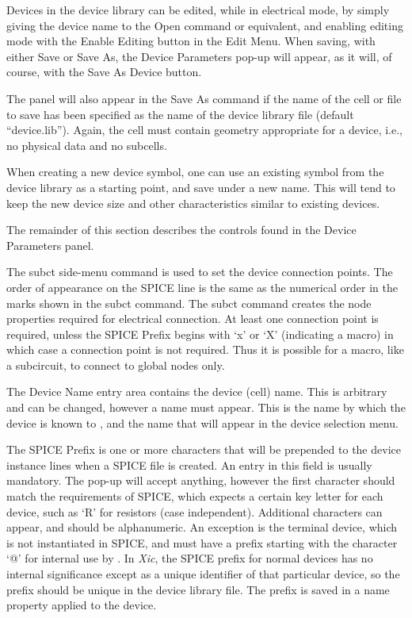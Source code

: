Devices in the device library can be edited, while in electrical mode,
by simply giving the device name to the {\cb Open} command or
equivalent, and enabling editing mode with the {\cb Enable Editing}
button in the {\cb Edit Menu}.  When saving, with either {\cb Save} or
{\cb Save As}, the {\cb Device Parameters} pop-up will appear, as it will,
of course, with the {\cb Save As Device} button.

The panel will also appear in the {\cb Save As} command if the name of
the cell or file to save has been specified as the name of the device
library file (default ``{\vt device.lib}'').  Again, the cell must
contain geometry appropriate for a device, i.e., no physical data and
no subcells. 

When creating a new device symbol, one can use an existing symbol from
the device library as a starting point, and save under a new name. 
This will tend to keep the new device size and other characteristics
similar to existing devices.

The remainder of this section describes the controls found in the 
{\cb Device Parameters} panel.

The {\cb subct} side-menu command is used to set the device connection
points.  The order of appearance on the SPICE line is the same as the
numerical order in the marks shown in the {\cb subct} command.  The
{\cb subct} command creates the {\et node} properties required for
electrical connection.  At least one connection point is required,
unless the {\cb SPICE Prefix} begins with `x' or `X' (indicating a
macro) in which case a connection point is not required.  Thus it is
possible for a macro, like a subcircuit, to connect to global nodes
only.

The {\cb Device Name} entry area contains the device (cell) name. 
This is arbitrary and can be changed, however a name must appear. 
This is the name by which the device is known to {\Xic}, and the name
that will appear in the device selection menu.

The {\cb SPICE Prefix} is one or more characters that will be
prepended to the device instance lines when a SPICE file is created. 
An entry in this field is usually mandatory.  The pop-up will accept
anything, however the first character should match the requirements of
SPICE, which expects a certain key letter for each device, such as
`{\vt R}' for resistors (case independent).  Additional characters can
appear, and should be alphanumeric.  An exception is the terminal
device, which is not instantiated in SPICE, and must have a prefix
starting with the character `{\vt @}' for internal use by {\Xic}.  In
{\it Xic}, the {\cb SPICE prefix} for normal devices has no internal
significance except as a unique identifier of that particular device,
so the prefix should be unique in the device library file.  The prefix
is saved in a {\et name} property applied to the device.


